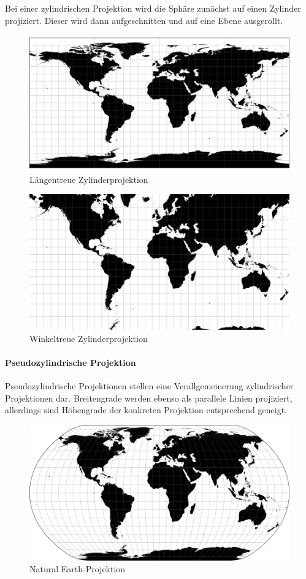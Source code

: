 Bei einer zylindrischen Projektion wird die Sphäre zunächst auf einen Zylinder projiziert. Dieser wird dann aufgeschnitten und auf eine Ebene ausgerollt.

\begin{figure}[H]
    \centering
    
    \includegraphics[width=.5\textwidth]{images/equirectangular}
    \caption{Längentreue Zylinderprojektion}
\end{figure}

\begin{figure}[H]
    \centering
    
    \includegraphics[width=.5\textwidth]{images/mercator}
    \caption{Winkeltreue Zylinderprojektion}
\end{figure}

\paragraph{Pseudozylindrische Projektion}

Pseudozylindrische Projektionen stellen eine Verallgemeinerung zylindrischer Projektionen dar. Breitengrade werden ebenso als parallele Linien projiziert, allerdings sind Höhengrade der konkreten Projektion entsprechend geneigt.

\begin{figure}[H]
    \centering
    
    \includegraphics[width=.5\textwidth]{images/naturalEarth1}
    \caption{\glqq Natural Earth\grqq -Projektion}
\end{figure}

